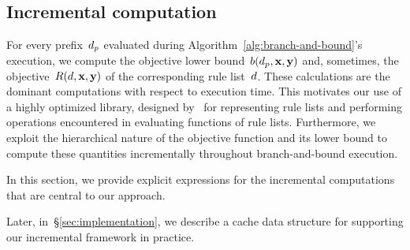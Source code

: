 \subsection{Incremental computation}
\label{sec:incremental}

For every prefix~$d_p$ evaluated during
Algorithm~\ref{alg:branch-and-bound}'s execution, we compute
the objective lower bound~${b(d_p, \mathbf{x}, \mathbf{y})}$ and, sometimes,
the objective~${R({d}, \mathbf{x}, \mathbf{y})}$ of the corresponding rule list~${d}$.
%
These calculations are the dominant computations with respect to execution time.
%
This motivates our use of a highly optimized library,
designed by~\citet{YangRuSe16} for representing rule lists and
performing operations encountered in evaluating functions of rule lists.
%
Furthermore, we exploit the hierarchical nature of the objective
function and its lower bound to compute these quantities
incrementally throughout branch-and-bound execution.
%
\begin{arxiv}
In this section, we provide explicit expressions for
the incremental computations that are central to our approach.
\end{arxiv}
%
Later, in~\S\ref{sec:implementation}, we describe a cache data structure
for supporting our incremental framework in practice.

